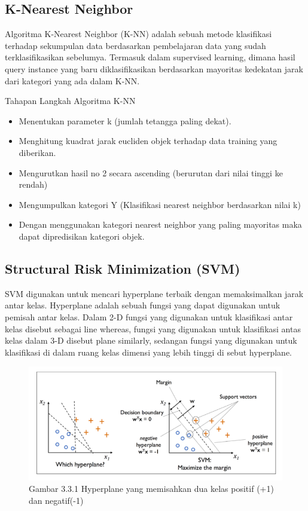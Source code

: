 \documentclass[conference]{IEEEtran}
\begin{document}
\subsection{K-Nearest Neighbor}
Algoritma K-Nearest Neighbor (K-NN) adalah sebuah metode klasifikasi terhadap sekumpulan data berdasarkan pembelajaran  data yang sudah terklasifikasikan sebelumya. Termasuk dalam supervised learning, dimana hasil query instance yang baru diklasifikasikan berdasarkan mayoritas kedekatan jarak dari kategori yang ada dalam K-NN.

 Tahapan Langkah Algoritma K-NN
\begin{itemize}
    \item Menentukan parameter k (jumlah tetangga paling dekat).
    \item Menghitung kuadrat jarak eucliden objek terhadap data training yang diberikan.
    \item Mengurutkan hasil no 2 secara ascending (berurutan dari nilai tinggi ke rendah)
    \item Mengumpulkan kategori Y (Klasifikasi nearest neighbor berdasarkan nilai k)
    \item Dengan menggunakan kategori nearest neighbor yang paling mayoritas maka dapat dipredisikan kategori objek.
\end{itemize}

\subsection{Structural Risk Minimization (SVM)}
SVM digunakan untuk mencari hyperplane terbaik dengan memaksimalkan jarak antar kelas. Hyperplane adalah sebuah fungsi yang dapat digunakan untuk pemisah antar kelas. Dalam 2-D fungsi yang digunakan untuk klasifikasi antar kelas disebut sebagai line whereas, fungsi yang digunakan untuk klasifikasi antas kelas dalam 3-D disebut plane similarly, sedangan fungsi yang digunakan untuk klasifikasi di dalam ruang kelas dimensi yang lebih tinggi di sebut hyperplane.

\begin{figure}
\centering
\includegraphics[width=.4\textwidth]{picture/Gambar 3.3.1.png}
\caption{Gambar 3.3.1 Hyperplane yang memisahkan dua kelas positif (+1) dan negatif(-1)}
\end{figure}
\end{document}
